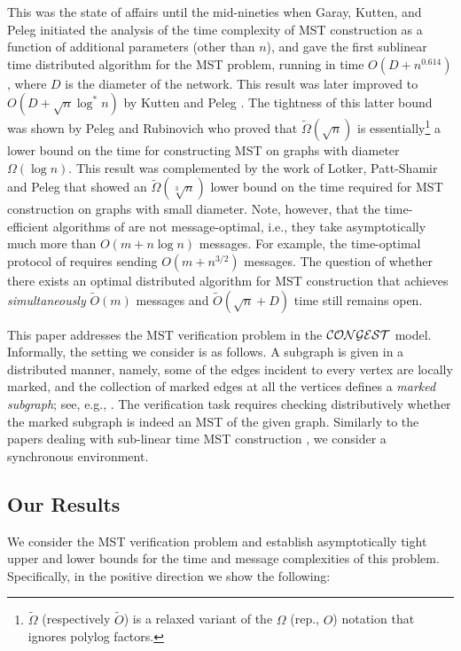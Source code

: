 \documentclass[11pt,letter]{article}
\begin{document}
This was the state of affairs until the mid-nineties when Garay, Kutten, 
and Peleg \cite{GKP98} initiated the analysis of the time complexity 
of MST construction as a function of additional parameters (other than $n$), 
and gave the first sublinear time distributed algorithm for the MST problem, 
running in time $O(D+n^{0.614})$, where $D$ is the diameter of the network. 
This result was later improved to $O(D + \sqrt{n} \log^* n)$ by 
Kutten and Peleg \cite{KP_98}.
The tightness of this latter bound was shown by  
Peleg and Rubinovich \cite{PR_00} who proved that 
$\tilde{\Omega}(\sqrt{n})$ is essentially\footnote{$\tilde{\Omega}$ 
(respectively $\tilde{O}$) is a relaxed variant of the $\Omega$ (rep., $O$) 
notation that ignores polylog factors.}
a lower bound on the time for constructing MST on graphs with
diameter $\Omega(\log n)$. This result was complemented by the work 
of Lotker,  Patt-Shamir and  Peleg \cite{LPP_01} that showed an 
$\tilde{\Omega}(\sqrt[3]{n})$ lower bound on the time required for 
MST construction on graphs with small diameter. 
Note, however, that the time-efficient algorithms of \cite{GKP98,KP_98} 
are not message-optimal, i.e., they take asymptotically much more than 
$O(m+n \log n)$ messages. For example, the time-optimal protocol 
of \cite{KP_98} requires sending $O(m + n^{3/2})$ messages. 
The question of whether there exists an optimal distributed algorithm for MST 
construction that achieves {\em simultaneously} $\tilde{O}(m)$ messages 
and $\tilde{O}(\sqrt{n} + D)$ time still remains open.

This paper addresses the MST verification problem in the $\cal{CONGEST}$ model. 
Informally, the setting we consider is as follows. 
A subgraph is given in a distributed manner, namely, some of 
the edges incident to every vertex are locally marked, and the collection of 
marked edges at all the vertices defines a {\em marked subgraph}; see, e.g., 
\cite{CGKK95,GHS_83,KK07,KKP10}. The verification task requires checking 
distributively whether the marked subgraph is indeed an MST of the given graph. 
Similarly to the papers dealing with sub-linear time MST construction 
\cite{GKP98,KP_98}, we consider a synchronous environment. 


\subsection{Our Results}

We consider the MST verification problem and establish asymptotically tight 
upper and lower bounds for the time and message complexities of this problem.
Specifically, in the positive direction we show the following:
\end{document}

